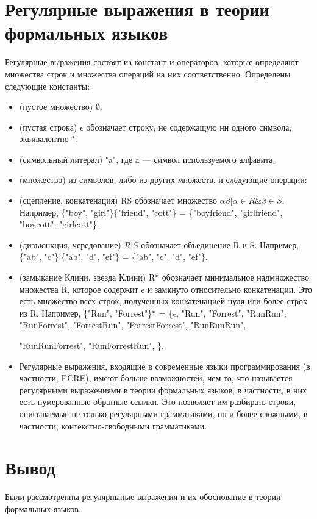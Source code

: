 \documentclass[12pt]{report}
\begin{document}
\section{Регулярные выражения в теории формальных языков}
Регулярные выражения состоят из констант и операторов, которые определяют множества строк и множества операций на них соответственно. Определены следующие константы:
\begin{itemize}
\item (пустое множество) $\emptyset$.
\item (пустая строка) $\epsilon$ обозначает строку, не содержащую ни одного символа; эквивалентно \"".
\item (символьный литерал) "a", где a — символ используемого алфавита.
\item (множество) из символов, либо из других множеств.
и следующие операции:
\end{itemize}
\begin{itemize}
	\item (сцепление, конкатенация) RS обозначает множество ${\alpha\beta | \alpha \in R  \& \beta \in S}$. Например, \{"boy", "girl"\}\{"friend", "cott"\} = \{"boyfriend", "girlfriend", "boycott", "girlcott"\}.
	\item(дизъюнкция, чередование) $R|S$ обозначает объединение R и S. Например, \{"ab", "c"\}|\{"ab", "d", "ef"\} = \{"ab", "c", "d", "ef"\}.
	\item(замыкание Клини, звезда Клини) R* обозначает минимальное надмножество множества R, которое содержит $\epsilon$ и замкнуто относительно конкатенации. Это есть множество всех строк, полученных конкатенацией нуля или более строк из R. Например, \{"Run", "Forrest"\}* = \{$\epsilon$, "Run", "Forrest", "RunRun", "RunForrest", "ForrestRun", "ForrestForrest", "RunRunRun",
	
	 "RunRunForrest", "RunForrestRun", \}.
	\item Регулярные выражения, входящие в современные языки программирования (в частности, PCRE), имеют больше возможностей, чем то, что называется регулярными выражениями в теории формальных языков; в частности, в них есть нумерованные обратные ссылки. Это позволяет им разбирать строки, описываемые не только регулярными грамматиками, но и более сложными, в частности, контекстно-свободными грамматиками.
\end{itemize}
\section{Вывод}
Были рассмотренны регулярныные выражения и их обоснование в теории формальных языков.
\end{document}
